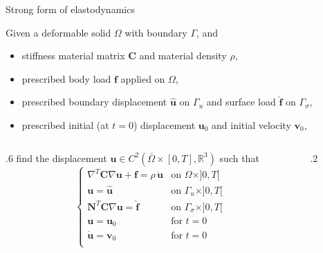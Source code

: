 \documentclass[aspectratio=169]{beamer}
\begin{document}
{{
\begin{frame}{Strong form of elastodynamics}
  \begin{block}{}
    Given a deformable solid $\Omega$ with boundary $\Gamma$, and
    \begin{itemize}
      \item stiffness material matrix $\mathbf C$ and material density $\rho$,
      \item prescribed body load $\mathbf f$ applied on $\Omega$,
      \item prescribed boundary displacement $\mathbf{\hat u}$ on $\Gamma_{u}$ and surface load $\mathbf{\hat f}$ on $\Gamma_{\sigma}$,
      \item prescribed initial (at $t=0$) displacement $\mathbf u_{0}$ and initial velocity $\mathbf v_{0}$,
    \end{itemize}
    \begin{columns}[T]
      \begin{column}{.6\textwidth}
        find the displacement $\mathbf u\in C^{2}(\bar\Omega\times[0,T],\mathbb R^{3})$ such that
        $$\begin{cases}
            \nabla^T\mathbf C\nabla \mathbf u+\mathbf f=\rho\, \mathbf{\ddot{u}} & \text{on }\Omega\times]0,T[         \\
            \mathbf u=\mathbf{\hat u}                                            & \text{on } \Gamma_u\times]0,T[      \\
            \mathbf N^T\mathbf  C\nabla\mathbf  u=\mathbf{\hat f}                & \text{on } \Gamma_\sigma\times]0,T[ \\
            \mathbf u=\mathbf u_0                                                & \text{for } t=0                     \\
            \mathbf{\dot u} =\mathbf v_0                                         & \text{for } t=0                     \\
          \end{cases}$$
      \end{column}
      \hfill
      \begin{column}{.2\textwidth}
        \vspace{-0.5cm}
        \begin{center}
\end{center}
\end{column}
\end{columns}
\end{block}
\end{frame}}}
\end{document}
